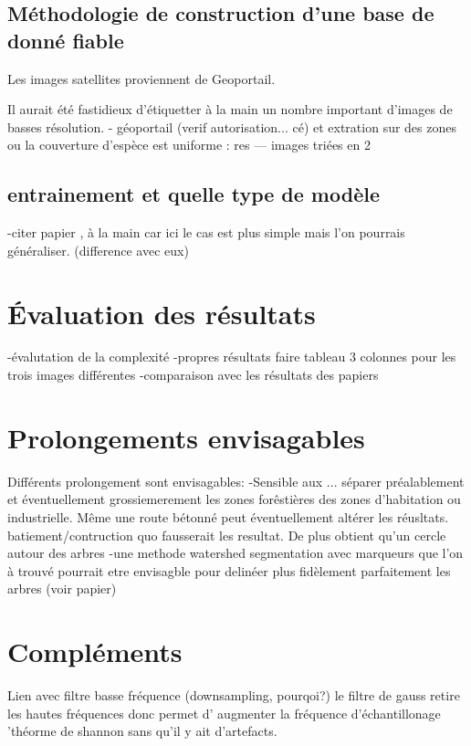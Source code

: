 \documentclass{article}
\begin{document}
	\subsection{Méthodologie de construction d'une base de donné fiable}

		Les images satellites proviennent de Geoportail. 

		Il aurait été fastidieux d'étiquetter à la main un nombre important d'images de basses résolution.   
		- géoportail (verif autorisation... cé) et extration sur des zones ou la couverture d'espèce est uniforme : res --- images triées en 2
	
	\subsection{entrainement et quelle type de modèle }
		-citer papier , à la main car ici le cas est plus simple mais l'on pourrais généraliser. (difference avec eux)

\section{\'{E}valuation des résultats}
	-évalutation de la complexité 
	-propres résultats
	faire tableau 3 colonnes pour les trois images différentes
	-comparaison avec les résultats des papiers 

\section{Prolongements envisagables}

	Différents prolongement sont envisagables: 
	-Sensible aux ... séparer préalablement et éventuellement grossiemerement les zones forêstières des zones d'habitation ou  industrielle. Même une route bétonné peut éventuellement altérer les réusltats. batiement/contruction quo fausserait les resultat. 
	De plus obtient qu'un cercle autour des arbres
	-une methode watershed segmentation avec marqueurs que l'on à trouvé pourrait etre envisagble pour delinéer plus fidèlement parfaitement les arbres (voir papier) 

	
\nocite{NatesanResNet} %



\appendix

	\section{Compléments}
		Lien avec filtre basse fréquence (downsampling, pourqoi?)
		le filtre de gauss retire les hautes fréquences donc permet d' augmenter la fréquence d'échantillonage 'théorme de shannon sans qu'il y ait d'artefacts. 
	
\end{document}

